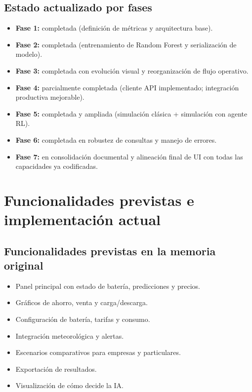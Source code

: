 \documentclass[12pt,a4paper]{article}
\begin{document}
\subsection{Estado actualizado por fases}
\begin{itemize}
    \item \textbf{Fase 1:} completada (definici\'on de m\'etricas y arquitectura base).
    \item \textbf{Fase 2:} completada (entrenamiento de Random Forest y serializaci\'on de modelo).
    \item \textbf{Fase 3:} completada con evoluci\'on visual y reorganizaci\'on de flujo operativo.
    \item \textbf{Fase 4:} parcialmente completada (cliente API implementado; integraci\'on productiva mejorable).
    \item \textbf{Fase 5:} completada y ampliada (simulaci\'on cl\'asica + simulaci\'on con agente RL).
    \item \textbf{Fase 6:} completada en robustez de consultas y manejo de errores.
    \item \textbf{Fase 7:} en consolidaci\'on documental y alineaci\'on final de UI con todas las capacidades ya codificadas.
\end{itemize}

\section{Funcionalidades previstas e implementaci\'on actual}
\subsection{Funcionalidades previstas en la memoria original}
\begin{itemize}
    \item Panel principal con estado de bater\'ia, predicciones y precios.
    \item Gr\'aficos de ahorro, venta y carga/descarga.
    \item Configuraci\'on de bater\'ia, tarifas y consumo.
    \item Integraci\'on meteorol\'ogica y alertas.
    \item Escenarios comparativos para empresas y particulares.
    \item Exportaci\'on de resultados.
    \item Visualizaci\'on de c\'omo decide la IA.
\end{itemize}
\end{document}
